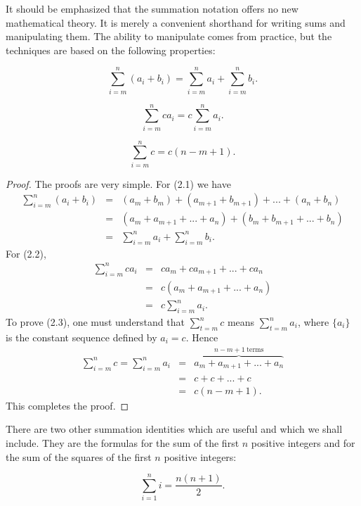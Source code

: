 It should be emphasized that the summation notation offers no new mathematical theory. It is merely a convenient shorthand for writing sums and manipulating them. The ability to manipulate comes from practice, but the techniques are based on the following properties:

\begin{theorem} %
$$
\sum_{i = m}^{n} (a_{i} + b_{i}) = \sum_{i = m}^{n} a_{i} + \sum_{i = m}^{n} b_{i}.
$$
\end{theorem}

\begin{theorem} %
$$
\sum_{i = m}^{n} ca_{i} = c \sum_{i = m}^{n} a_{i}.
$$ 
\end{theorem}

\begin{theorem} %
$$
\sum_{i = m}^{n} c = c (n - m + 1).
$$
\end{theorem}

\begin{proof}
The proofs are very simple. For (2.1) we have 
\begin{eqnarray*}
\sum_{i = m}^{n}(a_{i} + b_{i}) &=& (a_{m} + b_{m}) + (a_{m+1} + b_{m+1}) + ... + (a_{n} + b_{n})\\
&=& (a_m + a_{m +1} + ... + a_{n}) + (b_{m} + b_{m +1} + ... + b_{n})\\
&=& \sum_{i = m}^{n} a_{i} + \sum_{i = m}^{n} b_i.
\end{eqnarray*}
For (2.2),  
\begin{eqnarray*}
\sum_{i = m}^{n} ca_{i} &=& ca_{m} + ca_{m + 1} + ... + ca_{n}\\
                          &=& c(a_{m} + a_{m + 1} + ... + a_{n})\\
                          &=& c \sum_{i = m}^{n} a_{i}.
\end{eqnarray*}
To prove (2.3), one must understand that $\sum_{t = m}^{n} c$ means 
$\sum_{t = m}^{n} a_{i}$, where $\{ a_{i} \}$ is the constant sequence defined by $a_{i} = c$. Hence
\begin{eqnarray*}
\sum_{i = m}^{n} c = \sum_{i = m}^{n} a_{i }
&=& \overbrace{a_{m} + a_{m +1} + ... + a_{n}}^{n - m + 1 \;\mbox{terms}}\\
&=& c + c + ... + c \\
&=& c(n - m + 1).
\end{eqnarray*}
This completes the proof.
\end{proof}

There are two other summation identities which are useful and which we shall include. They are the formulas for the sum of the first $n$ positive integers and for the sum of the squares of the first $n$ positive integers:
\begin{theorem} %
$$
\sum_{i = 1}^{n} i = \frac{n(n+1)} {2}.
$$
\end{theorem}

